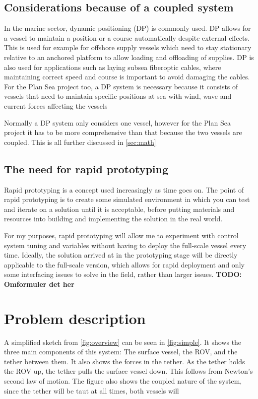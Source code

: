 \subsection{Considerations because of a coupled system}
In the marine sector, dynamic positioning (DP) is commonly used. DP allows for a vessel to maintain a position or a course automatically despite external effects. This is used for example for offshore supply vessels which need to stay stationary relative to an anchored platform to allow loading and offloading of supplies. DP is also used for applications such as laying subsea fiberoptic cables, where maintaining correct speed and course is important to avoid damaging the cables. For the Plan Sea project too, a DP system is necessary because it consists of vessels that need to maintain specific positions at sea with wind, wave and current forces affecting the vessels

Normally a DP system only considers one vessel, however for the Plan Sea project it has to be more comprehensive than that because the two vessels are coupled. This is all further discussed in \cref{sec:math}

\subsection{The need for rapid prototyping}
Rapid prototyping is a concept used increasingly as time goes on. The point of rapid prototyping is to create some simulated environment in which you can test and iterate on a solution until it is acceptable, before putting materials and resources into building and implementing the solution in the real world. 

For my purposes, rapid prototyping will allow me to experiment with control system tuning and variables without having to deploy the full-scale vessel every time. Ideally, the solution arrived at in the prototyping stage will be directly applicable to the full-scale version, which allows for rapid deployment and only some interfacing issues to solve in the field, rather than larger issues. \textbf{TODO: Omformuler det her}

\section{Problem description}
A simplified sketch from \cref{fig:overview} can be seen in \cref{fig:simple}. It shows the three main components of this system: The surface vessel, the ROV, and the tether between them. It also shows the forces in the tether. As the tether holds the ROV up, the tether pulls the surface vessel down. This follows from Newton's second law of motion. The figure also shows the coupled nature of the system, since the tether will be taut at all times, both vessels will

